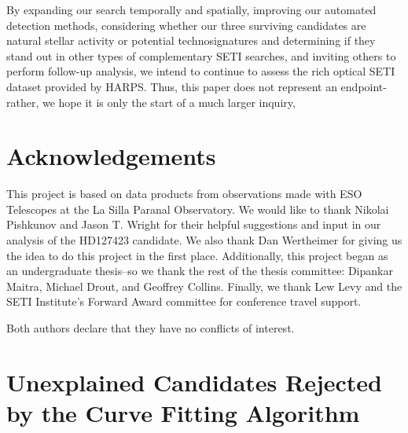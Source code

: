 \documentclass[linenumbers]{aastex631}
\begin{document}
By expanding our search temporally and spatially, improving our automated detection methods, considering whether our three surviving candidates are natural stellar activity or potential technosignatures and determining if they stand out in other types of complementary SETI searches, and inviting others to perform follow-up analysis, we intend to continue to assess the rich optical SETI dataset provided by HARPS. Thus, this paper does not represent an endpoint-rather, we hope it is only the start of a much larger inquiry,


\section{Acknowledgements}
This project is based on data products from observations made with ESO Telescopes at the La Silla Paranal Observatory. We would like to thank Nikolai Pishkunov and Jason T. Wright for their helpful suggestions and input in our analysis of the HD127423 candidate. We also thank Dan Wertheimer for giving us the idea to do this project in the first place. Additionally, this project began as an undergraduate thesis--so we thank the rest of the thesis committee: Dipankar Maitra, Michael Drout, and Geoffrey Collins. Finally, we thank Lew Levy and the SETI Institute's Forward Award committee for conference travel support.


Both authors declare that they have no conflicts of interest.

\appendix

\section{Unexplained Candidates Rejected by the Curve Fitting Algorithm}
\label{s:rejects}
\end{document}
